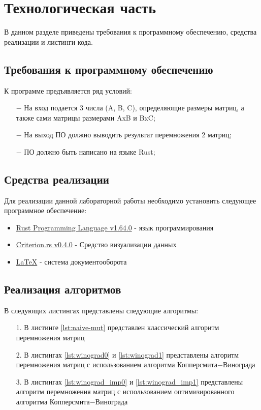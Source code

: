 \chapter{Технологическая часть}

В данном разделе приведены требования к программному обеспечению, средства реализации и листинги кода.

\section{Требования к программному обеспечению}
К программе предъявляется ряд условий:
\begin{itemize}
    \item[$-$] На вход подается 3 числа (A, B, C), определяющие размеры матриц, а также сами матрицы размерами AxB и BxC;
    \item[$-$] На выход ПО должно выводить результат перемножения 2 матриц;
    \item[$-$] ПО должно быть написано на языке Rust;
\end{itemize}

\section{Средства реализации}
Для реализации данной лабораторной работы необходимо установить следующее программное обеспечение:
\begin{itemize}
    \item \href{https://www.rust-lang.org/}{Rust Programming Language v1.64.0} - язык программирования
    \item \href{https://github.com/bheisler/criterion.rs}{Criterion.rs v0.4.0} - Средство визуализации данных
    \item \href{https://www.latex-project.org/}{LaTeX} - система документооборота
\end{itemize}

\section{Реализация алгоритмов}
В следующих листингах представлены следующие алгоритмы:
\begin{itemize}
    \item[1.] В листинге \ref{lst:naive-mut} представлен классический алгоритм перемножения матриц
    \item[2.] В листингах \ref{lst:winograd0} и \ref{lst:winograd1} представлены алгоритм перемножения матриц с использованием алгоритма Копперсмита$-$Винограда
    \item[3.] В листингах \ref{lst:winograd_imp0} и \ref{lst:winograd_imp1} представлены алгоритм перемножения матриц с использованием оптимизированного алгоритма Копперсмита$-$Винограда
\end{itemize}
\newpage

